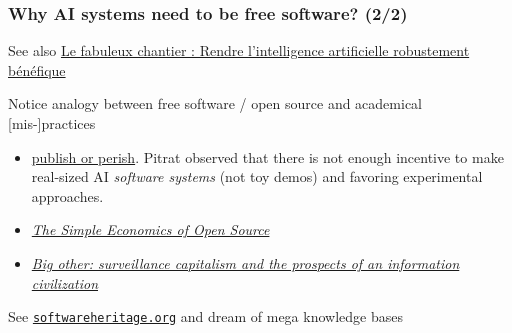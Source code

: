 \documentclass[xcolor=svgnames,final,smaller,a4]{beamer}
\begin{document}
 \begin{frame}
   \frametitle{Why AI systems need to be free software? (2/2)}

   See also \href{https://laboutique.edpsciences.fr/produit/1107/9782759824304/Le\%20fabuleux\%20chantier}{
   Le fabuleux chantier : Rendre l’intelligence artificielle
   robustement bénéfique {}}

   Notice analogy between free software / open source and academical [mis-]practices

   \bigskip
   

   \begin{itemize}
   \item
     \href{https://en.wikipedia.org/wiki/Publish_or_perish}{publish or
       perish}. Pitrat observed that there is not enough incentive to
     make real-sized AI \emph{software systems} (not toy demos) and
     favoring experimental approaches.

   \item \href{https://www.nber.org/papers/w7600}{\textit{The Simple Economics of Open Source}}

   \item \href{https://cryptome.org/2015/07/big-other.pdf}{\textit{Big other: surveillance capitalism and the prospects of an information civilization}}
   \end{itemize}

   \medskip
   
   See \href{https://softwareheritage.org/}{\texttt{softwareheritage.org}}
   and dream of mega  knowledge bases
 \end{frame}
\end{document}

